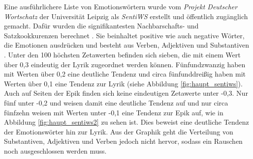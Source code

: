 \documentclass[a4paper,10p]{article}
\begin{document}
Eine ausführlichere Liste von Emotionswörtern wurde vom \textit{Projekt Deutscher Wortschatz} der Universität Leipzig als \textit{SentiWS} erstellt und öffentlich zugänglich gemacht. Dafür wurden die signifikantesten Nachbarschafts- und Satzkookkurenzen berechnet \citep{Sentiws}. Sie beinhaltet positive wie auch negative Wörter, die Emotionen ausdrücken und besteht aus Verben, Adjektiven und Substantiven \citep[vgl.]{Remus}. Unter den 100 höchsten Zetawerten befinden sich sieben, die mit einem Wert über 0,3 eindeutig der Lyrik zugeordnet werden können. Fünfundzwanzig haben mit Werten über 0,2 eine deutliche Tendenz und circa fünfunddreißig haben mit Werten über 0,1 eine Tendenz zur Lyrik (siehe Abbildung \ref{fig:haupt_sentiws}). Auch auf Seiten der Epik finden sich keine eindeutigen Zetawerte unter -0,3. Nur fünf unter -0,2 und weisen damit eine deutliche Tendenz auf und nur circa fünfzehn weisen mit Werten unter -0,1 eine Tendenz zur Epik auf, wie in Abbildung \ref{fig:haupt_sentiws2} zu sehen ist. Dies beweist eine deutliche Tendenz der Emotionswörter hin zur Lyrik. Aus der Graphik geht die Verteilung von Substantiven, Adjektiven und Verben jedoch nicht hervor, sodass ein Rauschen noch ausgeschlossen werden muss. \par 
\end{document}
